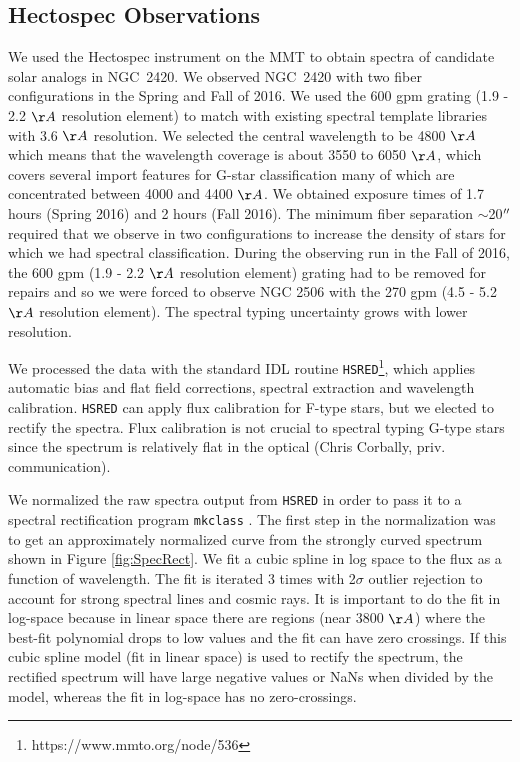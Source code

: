 \documentclass{aastex6}
\begin{document}
\subsection{Hectospec Observations}\label{sec:hectoObs}

We used the Hectospec instrument on the MMT \citep{fabricant2005hectospec,mink2007hectoFibers} to obtain spectra of candidate solar analogs in NGC~2420.
We observed NGC~2420 with two fiber configurations in the Spring and Fall of 2016.
We used the 600 gpm grating (1.9 - 2.2 $\AA$ resolution element) to match with existing spectral template libraries with 3.6 $\AA$ resolution.
We selected the central wavelength to be 4800 $\AA$ which means that the wavelength coverage is about 3550 to 6050 $\AA$, which covers several import features for G-star classification many of which are concentrated between 4000 and 4400 $\AA$.
We obtained exposure times of 1.7 hours (Spring 2016) and 2 hours (Fall 2016).
The minimum fiber separation $\sim$20$\mbox{$^{\prime\prime}$}$ required that we observe in two configurations to increase the density of stars for which we had spectral classification.
During the observing run in the Fall of 2016, the 600 gpm (1.9 - 2.2 $\AA$ resolution element) grating had to be removed for repairs and so we were forced to observe NGC 2506 with the 270 gpm (4.5 - 5.2 $\AA$ resolution element).
The spectral typing uncertainty grows with lower resolution.

We processed the data with the standard IDL routine \texttt{HSRED}\footnote{https://www.mmto.org/node/536}, which applies automatic bias and flat field corrections, spectral extraction and wavelength calibration.
\texttt{HSRED} can apply flux calibration for F-type stars, but we elected to rectify the spectra.
Flux calibration is not crucial to spectral typing G-type stars since the spectrum is relatively flat in the optical (Chris Corbally, priv. communication).

We normalized the raw spectra output from \texttt{HSRED} in order to pass it to a spectral rectification program \texttt{mkclass} \citep{gray2014classification}.
The first step in the normalization was to get an approximately normalized curve from the strongly curved spectrum shown in Figure \ref{fig:SpecRect}.
We fit a cubic spline in log space to the flux as a function of wavelength.
The fit is iterated 3 times with 2$\sigma$ outlier rejection to account for strong spectral lines and cosmic rays.
It is important to do the fit in log-space because in linear space there are regions (near 3800 $\AA$) where the best-fit polynomial drops to low values and the fit can have zero crossings.
If this cubic spline model (fit in linear space) is used to rectify the spectrum, the rectified spectrum will have large negative values or NaNs when divided by the model, whereas the fit in log-space has no zero-crossings.
\end{document}
